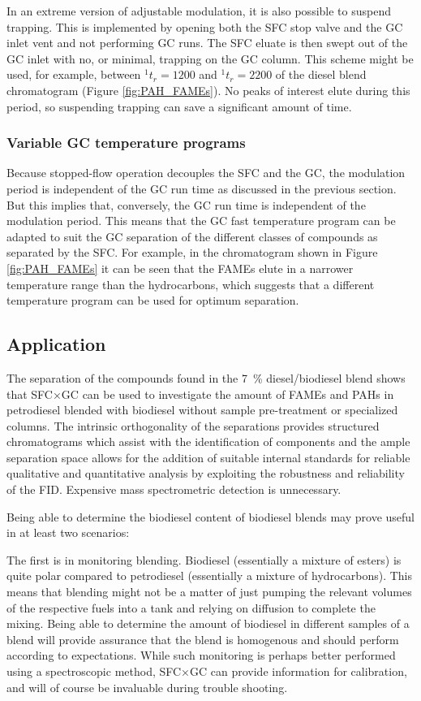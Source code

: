 In an extreme version of adjustable modulation, it is also possible to suspend
trapping. This is implemented by opening both the SFC stop valve and the GC
inlet vent and not performing GC runs. The SFC eluate is then swept out of the GC
inlet with no, or minimal, trapping on the GC column. This scheme might be used,
for example, between \(^{1}t_r = 1200\) and \(^{1}t_r = 2200\) of the diesel
blend chromatogram (Figure \ref{fig:PAH_FAMEs}). No peaks of interest elute
during this period, so suspending trapping can save a significant amount of
time.

\subsubsection{Variable GC temperature programs}

Because stopped-flow operation decouples the SFC and the GC, the modulation
period is independent of the GC run time as discussed in the previous section.
But this implies that, conversely,  the GC run time is independent of the
modulation period. This means that the GC fast temperature program can be
adapted to suit the GC separation of the different classes of compounds as
separated by the SFC. For example, in the chromatogram shown in Figure
\ref{fig:PAH_FAMEs} it can be seen that the FAMEs elute in a narrower
temperature range than the hydrocarbons, which suggests that a different
temperature program can be used for optimum separation.

\subsection{Application}

The separation of the compounds found in the \SI{7}{\percent} diesel/biodiesel
blend shows that SFC×GC can be used to investigate the amount of FAMEs and PAHs
in petrodiesel blended with biodiesel without sample pre-treatment or
specialized columns. The intrinsic orthogonality of the separations provides
structured chromatograms which assist with the identification of components and
the ample separation space allows for the addition of suitable internal
standards for reliable qualitative and quantitative analysis by exploiting the
robustness and reliability of the FID. Expensive mass spectrometric detection is
unnecessary.

Being able to determine the biodiesel content of biodiesel blends may prove
useful in at least two scenarios:

The first is in monitoring blending. Biodiesel (essentially a mixture of esters)
is quite polar compared to petrodiesel (essentially a mixture of hydrocarbons).
This means that blending might not be a matter of just pumping the relevant
volumes of the respective fuels into a tank and relying on diffusion to complete
the mixing. Being able to determine the amount of biodiesel in different samples
of a blend will provide assurance that the blend is homogenous and should
perform according to expectations. While such monitoring is perhaps better
performed using a spectroscopic method, SFC×GC can provide information for
calibration, and will of course be invaluable during trouble shooting.


